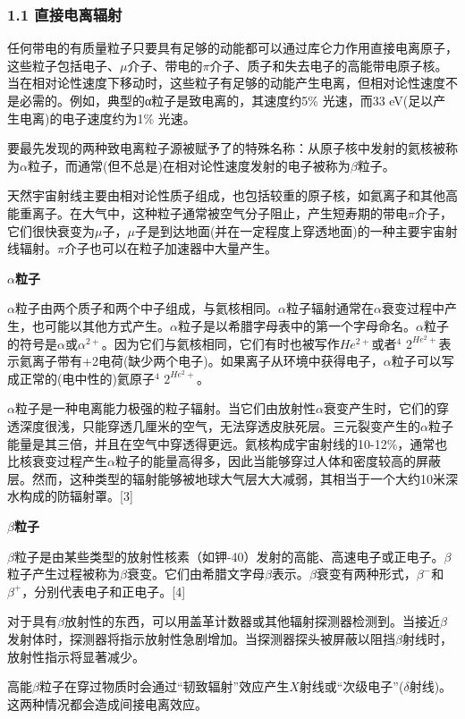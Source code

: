 \subsubsection{1.1 直接电离辐射}
任何带电的有质量粒子只要具有足够的动能都可以通过库仑力作用直接电离原子，这些粒子包括电子、$\mu$介子、带电的$\pi$介子、质子和失去电子的高能带电原子核。当在相对论性速度下移动时，这些粒子有足够的动能产生电离，但相对论性速度不是必需的。例如，典型的α粒子是致电离的，其速度约5\% 光速，而33 eV(足以产生电离)的电子速度约为1\% 光速。

要最先发现的两种致电离粒子源被赋予了的特殊名称：从原子核中发射的氦核被称为$\alpha$粒子，而通常(但不总是)在相对论性速度发射的电子被称为$\beta$粒子。

天然宇宙射线主要由相对论性质子组成，也包括较重的原子核，如氦离子和其他高能重离子。在大气中，这种粒子通常被空气分子阻止，产生短寿期的带电$\pi$介子，它们很快衰变为$\mu$子，$\mu$子是到达地面(并在一定程度上穿透地面)的一种主要宇宙射线辐射。$\pi$介子也可以在粒子加速器中大量产生。

\textbf{$\alpha$粒子}

$\alpha$粒子由两个质子和两个中子组成，与氦核相同。$\alpha$粒子辐射通常在$\alpha$衰变过程中产生，也可能以其他方式产生。$\alpha$粒子是以希腊字母表中的第一个字母命名。$\alpha$粒子的符号是$\alpha$或$\alpha^{2+}$。因为它们与氦核相同，它们有时也被写作$He^{2+}$或者$^{4}$
$2^{He^2+}$表示氦离子带有+2电荷(缺少两个电子)。如果离子从环境中获得电子，$\alpha$粒子可以写成正常的(电中性的)氦原子$^{4}$
$2^{He^2+}$。

$\alpha$粒子是一种电离能力极强的粒子辐射。当它们由放射性$\alpha$衰变产生时，它们的穿透深度很浅，只能穿透几厘米的空气，无法穿透皮肤死层。三元裂变产生的$\alpha$粒子能量是其三倍，并且在空气中穿透得更远。氦核构成宇宙射线的10-12\%，通常也比核衰变过程产生$\alpha$粒子的能量高得多，因此当能够穿过人体和密度较高的屏蔽层。然而，这种类型的辐射能够被地球大气层大大减弱，其相当于一个大约10米深水构成的防辐射罩。[3]

\textbf{$\beta$粒子}

$\beta$粒子是由某些类型的放射性核素（如钾-40）发射的高能、高速电子或正电子。$\beta$粒子产生过程被称为$\beta$衰变。它们由希腊文字母$\beta$表示。$\beta$衰变有两种形式，$\beta^-$和$\beta^+$，分别代表电子和正电子。[4]

对于具有$\beta$放射性的东西，可以用盖革计数器或其他辐射探测器检测到。当接近$\beta$发射体时，探测器将指示放射性急剧增加。当探测器探头被屏蔽以阻挡$\beta$射线时，放射性指示将显著减少。

高能$\beta$粒子在穿过物质时会通过“韧致辐射”效应产生$X$射线或“次级电子”($\delta$射线)。这两种情况都会造成间接电离效应。

